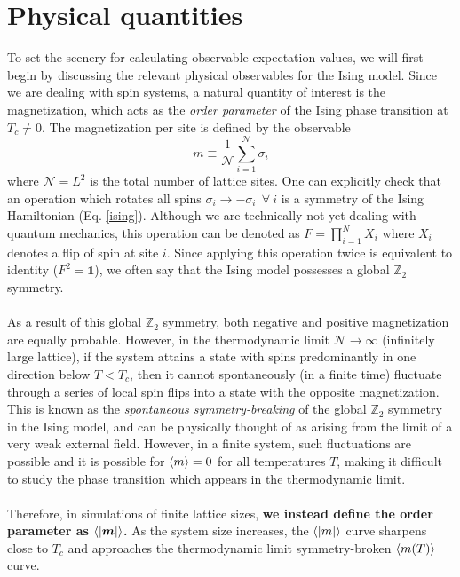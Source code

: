 \documentclass[../thesis_main.tex]{subfiles}
\begin{document}
\section{Physical quantities}
To set the scenery for calculating observable expectation values, we will first begin by discussing the relevant physical observables for the Ising model. Since we are dealing with spin systems, a natural quantity of interest is the magnetization, which acts as the \textit{order parameter} of the Ising phase transition at $T_c \neq 0$. The magnetization per site is defined by the observable
\begin{equation}
    m \equiv \frac{1}{\mathcal{N}} \sum_{i=1}^{\mathcal{N}} \sigma_i
\end{equation} 
where $\mathcal{N}=L^2$ is the total number of lattice sites. One can explicitly check that an operation which rotates all spins $\sigma_i \to -\sigma_i \:\: \forall \: i$ is a symmetry of the Ising Hamiltonian (Eq. \eqref{ising}). Although we are technically not yet dealing with quantum mechanics, this operation can be denoted as $F = \prod_{i=1}^N X_i$ where $X_i$ denotes a flip of spin at site $i$. Since applying this operation twice is equivalent to identity ($F^2 = \mathds{1}$), we often say that the Ising model possesses a global $\mathbb{Z}_2$ symmetry.~\\~\\
As a result of this global $\mathbb{Z}_2$ symmetry, both negative and positive magnetization are equally probable. However, in the thermodynamic limit $\mathcal{N} \to \infty$ (infinitely large lattice), if the system attains a state with spins predominantly in one direction below $T < T_c$, then it cannot spontaneously (in a finite time) fluctuate through a series of local spin flips into a state with the opposite magnetization. This is known as the \textit{spontaneous symmetry-breaking} of the global $\mathbb{Z}_2$ symmetry in the Ising model, and can be physically thought of as arising from the limit of a very weak external field. However, in a finite system, such fluctuations are possible and it is possible for $\expval{m} = 0$ for all temperatures $T$, making it difficult to study the phase transition which appears in the thermodynamic limit.~\\~\\
Therefore, in simulations of finite lattice sizes, \textbf{we instead define the order parameter as} ${\expval{|\boldsymbol{m}|}}$\textbf{.} As the system size increases, the $\expval{|m|}$ curve sharpens close to $T_c$ and approaches the thermodynamic limit symmetry-broken $\expval{m(T)}$ curve.~\\~\\
\end{document}
